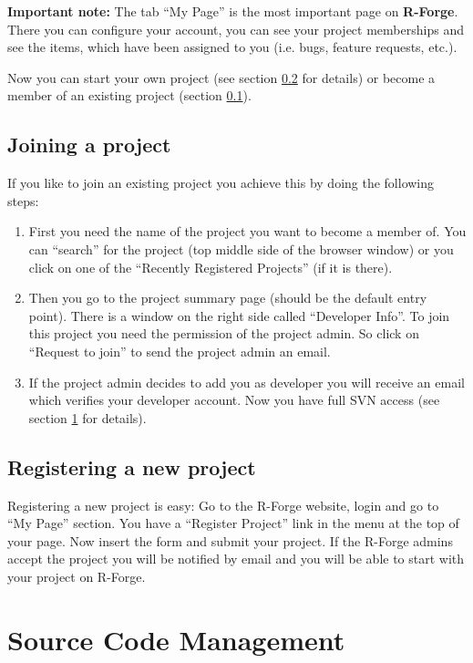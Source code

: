 \documentclass[a4paper]{article}
\begin{document}
\textbf{Important note:} The tab ``My Page'' is the most important
page on \textbf{R-Forge}. There you can configure your account, you can see your
project memberships and see the items, which have been assigned to you
(i.e. bugs, feature requests, etc.).
\newline

Now you can start your own project (see section \ref{sec:newproject}
for details) or become a member of an existing project (section \ref{sec:joinproject}).

\subsection{Joining a project}
\label{sec:joinproject}
If you like to join an existing project you achieve this by doing the
following steps:
\begin{enumerate}
\item First you need the name of the project you want to become a
  member of. You can ``search'' for the project (top middle side of the
  browser window) or you click on one of the ``Recently Registered
  Projects'' (if it is there).
\item Then you go to the project summary page (should be the default
  entry point). There is a window on the right side called
  ``Developer Info''. To join this project you need the permission of
  the project admin. So click on ``Request to join'' to send the
  project admin an email.
\item If the project admin decides to add you as developer you will
  receive an email which verifies your developer account. Now you have
  full SVN access (see section \ref{sec:scm} for details).
\end{enumerate}

\subsection{Registering a new project}
\label{sec:newproject}

Registering a new project is easy: Go to the R-Forge website, login and
go to ``My Page'' section. You have a ``Register Project'' link in the
menu at the top of your page. Now insert the form and submit your
project. If the R-Forge admins accept the project you will be notified
by email and you will be able to start with your project on R-Forge.

\section{Source Code Management}
\label{sec:scm}
\end{document}
